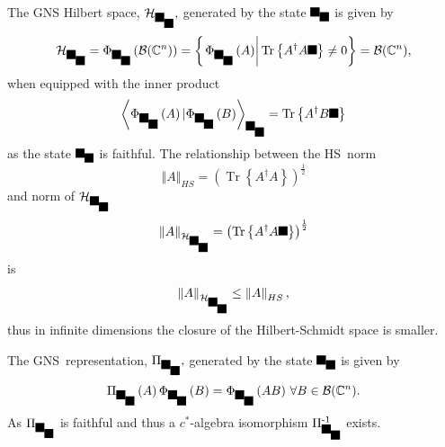 \documentclass[aps,preprint]{revtex4}%
\providecommand{\U}[1]{\protect\rule{.1in}{.1in}}
\begin{document}
The GNS Hilbert space, $\mathcal{H}_{\U{3c9} _{\U{3c1} }},$ generated by the
state $\U{3c9} _{\U{3c1} }$ is given by
\begin{equation}
\mathcal{H}_{\U{3c9} _{\U{3c1} }}=\Phi_{\U{3c9} _{\U{3c1} }}\left(
\mathcal{B}(\mathbb{C}^{n})\right)  =\left\{  \left.  \Phi_{\U{3c9} _{\U{3c1}
}}\left(  A\right)  \right\vert \operatorname{Tr}\left\{  A^{\dagger}A\U{3c1}
\right\}  \neq0\right\}  =\mathcal{B}(\mathbb{C}^{n}),
\end{equation}
when equipped with the inner product
\begin{equation}
\left\langle \Phi_{\U{3c9} _{\U{3c1} }}\left(  A\right)  |\Phi_{\U{3c9}
_{\U{3c1} }}\left(  B\right)  \right\rangle _{\U{3c9} _{\U{3c1} }%
}=\operatorname{Tr}\left\{  A^{\dagger}B\U{3c1} \right\}
\end{equation}
as the state $\U{3c9} _{\U{3c1} }$ is faithful. The relationship between the
HS\ norm
\begin{equation}
\left\Vert A\right\Vert _{HS}=\left(  \operatorname{Tr}\left\{  A^{\dagger
}A\right\}  \right)  ^{\frac{1}{2}}%
\end{equation}
and norm of $\mathcal{H}_{\U{3c9} _{\U{3c1} }}$
\begin{equation}
\left\Vert A\right\Vert _{\mathcal{H}_{\U{3c9} _{\U{3c1} }}}=\left(
\operatorname{Tr}\left\{  A^{\dagger}A\U{3c1} \right\}  \right)  ^{\frac{1}%
{2}}%
\end{equation}
is
\begin{equation}
\left\Vert A\right\Vert _{\mathcal{H}_{\U{3c9} _{\U{3c1} }}}\leq\left\Vert
A\right\Vert _{HS},
\end{equation}
thus in infinite dimensions the closure of the Hilbert-Schmidt space is smaller.

The GNS\ representation, $\Pi_{\U{3c9} _{\U{3c1} }},$ generated by the state
$\U{3c9} _{\U{3c1} }$ is given by
\begin{equation}
\Pi_{\U{3c9} _{\U{3c1} }}\left(  A\right)  \Phi_{\U{3c9} _{\U{3c1} }}\left(
B\right)  =\Phi_{\U{3c9} _{\U{3c1} }}\left(  AB\right)  \,\forall
B\in\mathcal{B}(\mathbb{C}^{n}).
\end{equation}
As $\Pi_{\U{3c9} _{\U{3c1} }}$ is faithful and thus a $c^{\ast}$-algebra
isomorphism $\Pi_{\U{3c9} _{\U{3c1} }}^{\text{-}1}$ exists.
\end{document}
